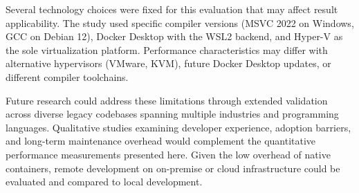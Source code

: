 Several technology choices were fixed for this evaluation that may affect result applicability.
The study used specific compiler versions (MSVC 2022 on Windows, GCC on Debian 12), Docker Desktop with the WSL2 backend, and Hyper-V as the sole virtualization platform.
Performance characteristics may differ with alternative hypervisors (VMware, KVM), future Docker Desktop updates, or different compiler toolchains.

Future research could address these limitations through extended validation across diverse legacy codebases spanning multiple industries and programming languages.
Qualitative studies examining developer experience, adoption barriers, and long-term maintenance overhead would complement the quantitative performance measurements presented here.
Given the low overhead of native containers, remote development on on-premise or cloud infrastructure could be evaluated and compared to local development.
